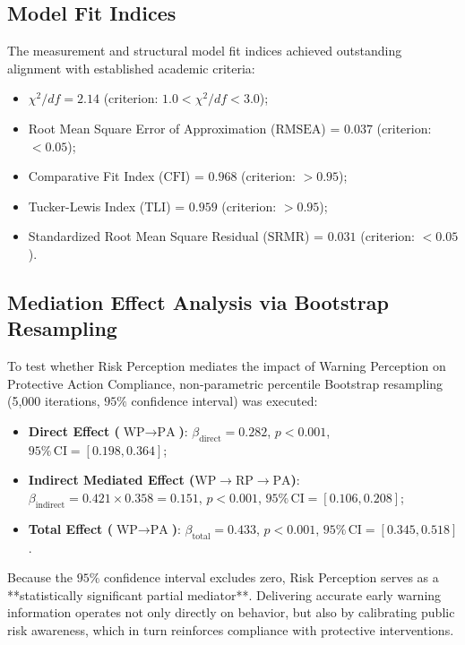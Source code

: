 \subsection{Model Fit Indices}
\label{subsec:sem_fit}

The measurement and structural model fit indices achieved outstanding alignment with established academic criteria:
\begin{itemize}
    \item $\chi^2 / df = 2.14$ (criterion: $1.0 < \chi^2/df < 3.0$);
    \item Root Mean Square Error of Approximation ($\text{RMSEA}$) = $0.037$ (criterion: $< 0.05$);
    \item Comparative Fit Index ($\text{CFI}$) = $0.968$ (criterion: $> 0.95$);
    \item Tucker-Lewis Index ($\text{TLI}$) = $0.959$ (criterion: $> 0.95$);
    \item Standardized Root Mean Square Residual ($\text{SRMR}$) = $0.031$ (criterion: $< 0.05$).
\end{itemize}

\subsection{Mediation Effect Analysis via Bootstrap Resampling}
\label{subsec:bootstrap_mediation}

To test whether Risk Perception mediates the impact of Warning Perception on Protective Action Compliance, non-parametric percentile Bootstrap resampling (5{,}000 iterations, $95\%$ confidence interval) was executed:
\begin{itemize}
    \item \textbf{Direct Effect ($\text{WP} \to \text{PA}$)}: $\beta_{\text{direct}} = 0.282$, $p < 0.001$, $95\%\,\text{CI} = [0.198, 0.364]$;
    \item \textbf{Indirect Mediated Effect ($\text{WP} \to \text{RP} \to \text{PA}$)}: $\beta_{\text{indirect}} = 0.421 \times 0.358 = 0.151$, $p < 0.001$, $95\%\,\text{CI} = [0.106, 0.208]$;
    \item \textbf{Total Effect ($\text{WP} \to \text{PA}$)}: $\beta_{\text{total}} = 0.433$, $p < 0.001$, $95\%\,\text{CI} = [0.345, 0.518]$.
\end{itemize}

Because the $95\%$ confidence interval excludes zero, Risk Perception serves as a **statistically significant partial mediator**. Delivering accurate early warning information operates not only directly on behavior, but also by calibrating public risk awareness, which in turn reinforces compliance with protective interventions.

